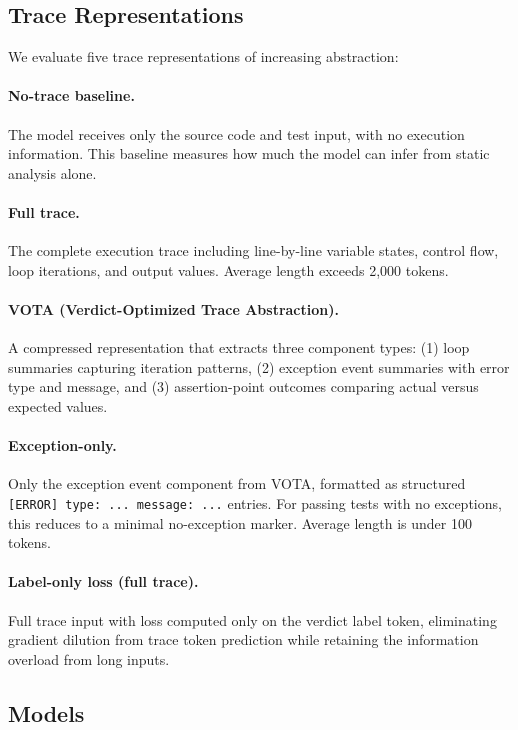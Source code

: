 \documentclass[11pt,a4paper]{article}
\begin{document}
\subsection{Trace Representations}

We evaluate five trace representations of increasing abstraction:

\paragraph{No-trace baseline.} The model receives only the source code and test input, with no execution information. This baseline measures how much the model can infer from static analysis alone.

\paragraph{Full trace.} The complete execution trace including line-by-line variable states, control flow, loop iterations, and output values. Average length exceeds 2,000 tokens.

\paragraph{VOTA (Verdict-Optimized Trace Abstraction).} A compressed representation that extracts three component types: (1) loop summaries capturing iteration patterns, (2) exception event summaries with error type and message, and (3) assertion-point outcomes comparing actual versus expected values.

\paragraph{Exception-only.} Only the exception event component from VOTA, formatted as structured \texttt{[ERROR] type: ... message: ...} entries. For passing tests with no exceptions, this reduces to a minimal no-exception marker. Average length is under 100 tokens.

\paragraph{Label-only loss (full trace).} Full trace input with loss computed only on the verdict label token, eliminating gradient dilution from trace token prediction while retaining the information overload from long inputs.

\subsection{Models}
\end{document}

